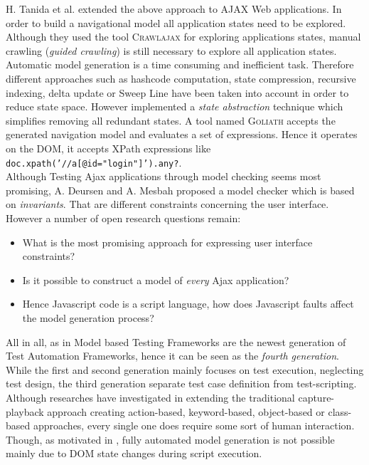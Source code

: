 \documentclass[12pt, notitlepage]{article}
\begin{document}
H. Tanida et al.\cite{dynamic-testing-web-applications} extended the above approach to AJAX Web applications. In order to build a navigational model all 
application states need to be explored. Although they used the tool \textsc{Crawlajax}\cite{crawlajax} for exploring applications states, manual
crawling (\textit{guided crawling}) is still necessary to explore all application states. Automatic model generation is a time consuming and inefficient task. 
Therefore different approaches such as hashcode computation, state compression, recursive indexing\cite{recursive-indexing}, delta update or Sweep
Line\cite{sweep-line} have been taken into account in order to reduce state space\cite{state-space-reduction}. However \cite{dynamic-testing-web-applications}
implemented a \textit{state abstraction} technique which simplifies removing all redundant states. A tool
named \textsc{Goliath} accepts the generated navigation model and evaluates a set of expressions. Hence it operates on the DOM, it accepts XPath expressions like \texttt{doc.xpath('//a[@id="login"]').any?}. \\
Although Testing Ajax applications through model checking seems most promising, A. Deursen and A. Mesbah\cite{research-issues-model-checking-ajax} proposed a model checker\cite{atusa} which is based on \textit{invariants}. That are
different constraints concerning the user interface. However a number of open research questions remain:
\begin{itemize}
	\item What is the most promising approach for expressing user interface constraints?
	\item Is it possible to construct a model of \textit{every} Ajax application?
	\item Hence Javascript code is a script language, how does Javascript faults affect the model generation process?
\end{itemize}
\vspace{1.5cm}
All in all, as in \cite{why-model-based-automation} Model based Testing Frameworks are the newest generation of Test
Automation Frameworks, hence it can be seen as the \textit{fourth generation}. While the first and second generation mainly focuses on test execution, neglecting test design, the third generation separate test case definition from test-scripting. Although researches have investigated in extending the traditional capture-playback approach creating action-based, keyword-based, object-based or class-based approaches, every single one does require
some sort of human interaction. Though, as motivated in \cite{crawlajax}, fully automated model generation is not possible mainly
due to DOM state changes during script execution. 
 
\end{document}
